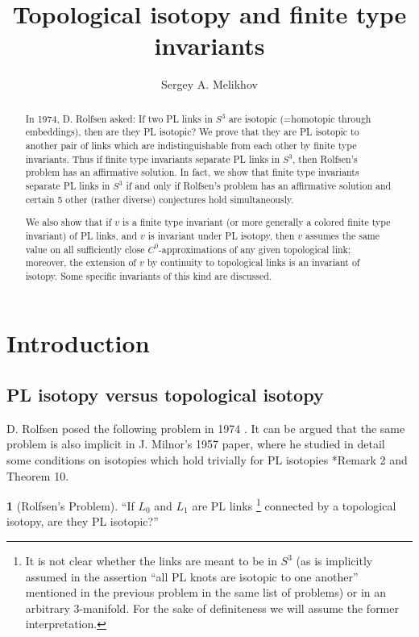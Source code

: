 \documentclass[a4paper,12pt,reqno,oneside]{amsart} %
\theoremstyle{plain}
\theoremstyle{definition}
\theoremstyle{named}
\newtheorem{namedthm}{}
\renewcommand{\:}{\colon}
\begin{document}
\title{Topological isotopy and finite type invariants} %
\author{Sergey A. Melikhov}
\address{Steklov Mathematical Institute of Russian Academy of Sciences, 8 Gubkina st., 119991 Moscow, Russia}

\begin{abstract}
In 1974, D. Rolfsen asked: If two PL links in $S^3$ are isotopic (=homotopic through embeddings), then are they PL isotopic?
We prove that they are PL isotopic to another pair of links which are indistinguishable from each other by finite type invariants.
Thus if finite type invariants separate PL links in $S^3$, then Rolfsen's problem has an affirmative solution.
In fact, we show that finite type invariants separate PL links in $S^3$ if and only if Rolfsen's problem has an affirmative solution
and certain 5 other (rather diverse) conjectures hold simultaneously. 

We also show that if $v$ is a finite type invariant (or more generally a colored finite type invariant) of PL links, and $v$ 
is invariant under PL isotopy, then $v$ assumes the same value on all sufficiently close $C^0$-approximations of 
any given topological link; moreover, the extension of $v$ by continuity to topological links is an invariant of isotopy.
Some specific invariants of this kind are discussed.
\end{abstract}

\maketitle

\section{Introduction} \label{intro}

\subsection{PL isotopy versus topological isotopy} D. Rolfsen posed the following problem in 1974 \cite{Ro1}.
It can be argued that the same problem is also implicit in J. Milnor's 1957 paper, where he studied in detail 
some conditions on isotopies which hold trivially for PL isotopies \cite{Mi2}*{Remark 2 and Theorem 10}.

\begin{namedthm}[Rolfsen's Problem] \label{Rolfsen's} ``If $L_0$ and $L_1$ are PL links%
\footnote{It is not clear whether the links are meant to be in $S^3$ (as is implicitly assumed in the assertion
``all PL knots are isotopic to one another'' mentioned in the previous problem in the same list of problems) 
or in an arbitrary $3$-manifold.
For the sake of definiteness we will assume the former interpretation.}
connected by a topological isotopy, are they PL isotopic?''
\end{namedthm}
\end{document}
